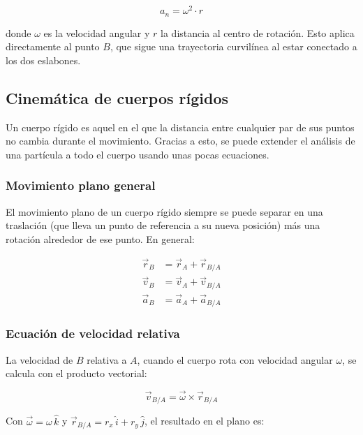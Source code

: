 \begin{equation}
	a_n = \omega^2 \cdot r
\end{equation}

donde $\omega$ es la velocidad angular y $r$ la distancia al centro de rotación.
Esto aplica directamente al punto $B$, que sigue una trayectoria curvilínea al estar
conectado a los dos eslabones.

\subsection{Cinemática de cuerpos rígidos}

Un cuerpo rígido es aquel en el que la distancia entre cualquier par de sus puntos no
cambia durante el movimiento. Gracias a esto, se puede extender el análisis de una partícula
a todo el cuerpo usando unas pocas ecuaciones.
\\
\subsubsection{Movimiento plano general}

El movimiento plano de un cuerpo rígido siempre se puede separar en una traslación (que
lleva un punto de referencia a su nueva posición) más una rotación alrededor de ese punto.
En general:

\begin{align} 
	\vec{r}_B &= \vec{r}_A + \vec{r}_{B/A} \label{eq:pos_rel} \\
	\vec{v}_B &= \vec{v}_A + \vec{v}_{B/A} \label{eq:vel_rel} \\
	\vec{a}_B &= \vec{a}_A + \vec{a}_{B/A} \label{eq:acc_rel} 
\end{align}

\subsubsection{Ecuación de velocidad relativa}

La velocidad de $B$ relativa a $A$, cuando el cuerpo rota con velocidad angular $\omega$,
se calcula con el producto vectorial:

\begin{equation}
	\vec{v}_{B/A} = \vec{\omega} \times \vec{r}_{B/A}
\end{equation}

Con $\vec{\omega} = \omega\,\hat{k}$ y $\vec{r}_{B/A} = r_x\,\hat{i} + r_y\,\hat{j}$,
el resultado en el plano es:

